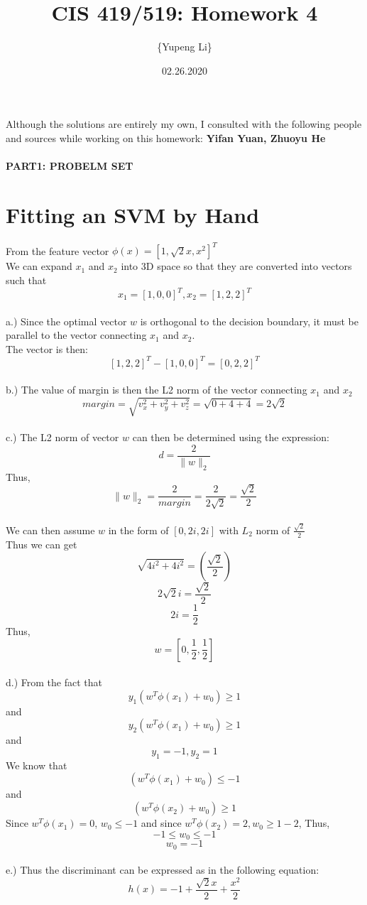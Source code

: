 \documentclass{article}
\title{CIS 419/519: Homework 4}
\author{\{Yupeng Li\}}
\date{02.26.2020}
\begin{document}
    \maketitle
    Although the solutions are entirely my own, I consulted with the following people and sources while working on this homework: \textbf{Yifan Yuan, Zhuoyu He}
    
    \paragraph{PART1: PROBELM SET}

    \section{Fitting an SVM by Hand}
    From the feature vector $\phi(x) = [1, \sqrt{2} x, x^2]^T$
    \\We can expand $x_1$ and $x_2$ into 3D space so that they are converted into vectors such that
    \[x_1 = [1,0,0]^T ,  x_2 = [1,2,2]^T\]
\\a.) Since the optimal vector $w$ is orthogonal to the decision boundary, it must be parallel to the vector connecting $x_1$ and $x_2$.\\
The vector is then:
\[[1,2,2]^T - [1,0,0]^T = [0,2,2]^T\]
\\b.) The value of margin is then the L2 norm of the vector connecting $x_1$ and $x_2$
\[margin = \sqrt{v_x^2 + v_y^2 + v_z^2} = \sqrt{0 + 4 +4} = 2\sqrt{2}\]
\\c.) The L2 norm of vector $w$ can then be determined using the expression:
\[d = \frac{2}{\|w\|_2}\]
Thus, \[\|w\|_2 = \frac{2}{margin} = \frac{2}{2\sqrt{2}} = \frac{\sqrt{2}}{2}\] 
\\We can then assume $w$ in the form of $[0,2i,2i]$ with $L_2$ norm of $\frac{\sqrt{2}}{2}$\\
Thus we can get \[\sqrt{4i^2 + 4i^2} = (\frac{\sqrt{2}}{2})\]
\[2\sqrt{2} i = \frac{\sqrt{2}}{2}\]
\[2i = \frac{1}{2}\]
Thus,\[ w = [0, \frac{1}{2},\frac{1}{2}]\]
\\d.) From the fact that 
\[y_1(w^T\phi(x_1) + w_0) \geq  1\]
and \[y_2(w^T\phi(x_1) + w_0) \geq  1\]
and \[y_1 = -1, y_2 = 1\]
We know that \[(w^T\phi(x_1) + w_0) \leq  -1\]
and \[(w^T\phi(x_2) + w_0) \geq  1\]
Since $w^T \phi(x_1) = 0$, $w_0 \leq -1$ and since $w^T \phi(x_2) = 2, w_0 \geq 1-2$, Thus,
\[-1 \leq w_0 \leq -1\]\[w_0 = -1\]
\\e.) Thus the discriminant can be expressed as in the following equation:
\begin{equation}
h(x) = -1 + \frac{\sqrt{2}x}{2} + \frac{x^2}{2}
\end{equation}
\end{document}
